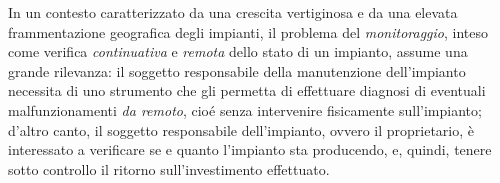 %
In un contesto caratterizzato da una crescita vertiginosa e da una 
elevata frammentazione geografica degli impianti, il problema del
\emph{monitoraggio}, inteso come verifica \emph{continuativa} e \emph{remota}
dello stato di un impianto, %
assume una grande rilevanza: il soggetto responsabile della manutenzione
dell'impianto necessita di uno strumento che gli permetta di
effettuare diagnosi di eventuali malfunzionamenti \emph{da remoto}, cio\'e 
senza intervenire fisicamente sull'impianto; d'altro canto, il soggetto 
responsabile dell'impianto, ovvero il proprietario, \`e interessato 
a verificare se e quanto l'impianto sta producendo, e, quindi, 
tenere sotto controllo il ritorno sull'investimento effettuato.

